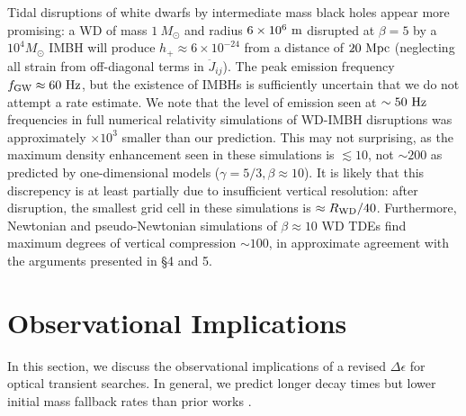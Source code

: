 \documentclass[useAMS, twocolumn, usenatbib]{mn2e}
\begin{document}
Tidal disruptions of white dwarfs by intermediate mass black holes appear more promising: a WD of mass $1~M_{\odot}$ and radius $6\times10^6~{\rm m}$ disrupted at $\beta=5$ by a $10^4 M_{\odot}$ IMBH will produce $h_{+}\approx 6\times 10^{-24}$ from a distance of $20~{\rm Mpc}$ (neglecting all strain from off-diagonal terms in $\ddot{J}_{ij}$).  The peak emission frequency $f_{\rm GW}\approx 60~{\rm Hz}$, but the existence of IMBHs is sufficiently uncertain that we do not attempt a rate estimate.  We note that the level of emission seen at $\sim 50~{\rm Hz}$ frequencies in full numerical relativity simulations of WD-IMBH disruptions \citep{Haas+12} was approximately $\times 10^3$ smaller than our prediction.  This may not surprising, as the maximum density enhancement seen in these simulations is $\lesssim 10$, not $\sim 200$ as predicted by one-dimensional models ($\gamma=5/3, \beta\approx 10$).  It is likely that this discrepency is at least partially due to insufficient vertical resolution: after disruption, the smallest grid cell in these simulations is $\approx R_{\rm WD}/40$.  Furthermore, Newtonian and pseudo-Newtonian simulations of $\beta \approx 10$ WD TDEs \citep{RosswogRR09} find maximum degrees of vertical compression $\sim 100$, in approximate agreement with the arguments presented in \S 4 and 5.

\section{Observational Implications}
In this section, we discuss the observational implications of a revised $\Delta\epsilon$ for optical transient searches.  In general, we predict longer decay times but lower initial mass fallback rates than prior works \citep{StrubbeQuataert09}.
\end{document}
